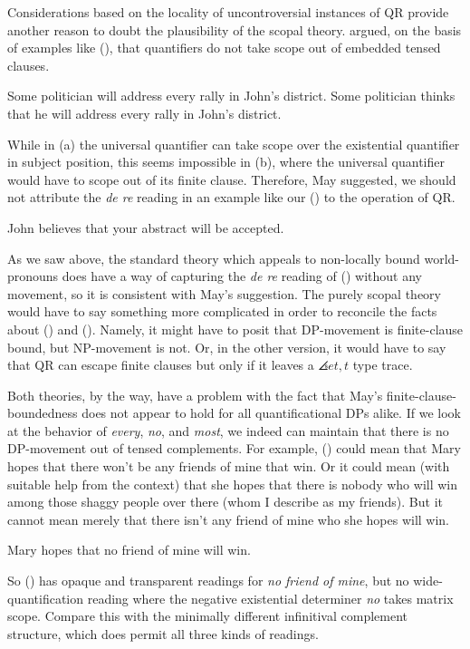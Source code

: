 Considerations based on the locality of uncontroversial instances of QR provide another reason to doubt the plausibility of the scopal theory. \citet{may:diss} argued, on the basis of examples like (\nextx), that quantifiers do not take scope out of embedded tensed clauses.

\pex
\a Some politician will address every rally in John's district. 
\a Some politician thinks that he will address every rally in John's district.
\xe

While in (\lastx a) the universal quantifier can take scope over the existential quantifier in subject position, this seems impossible in (\lastx b), where the universal quantifier would have to scope out of its finite clause. Therefore, May suggested, we should not attribute the \emph{de re} reading in an example like our (\nextx) to the operation of QR.

\ex John believes that your abstract will be accepted. \xe

As we saw above, the standard theory which appeals to non-locally bound world-pronouns does have a way of capturing the \emph{de re} reading of (\lastx) without any movement, so it is consistent with May's suggestion. The purely scopal theory would have to say something more complicated in order to reconcile the facts about (\blastx) and (\lastx). Namely, it might have to posit that DP-movement is finite-clause bound, but NP-movement is not. Or, in the other version, it would have to say that QR can escape finite clauses but only if it leaves a $\angles{et,t}$ type trace.

Both theories, by the way, have a problem with the fact that May's finite-clause-boundedness does not appear to hold for all quantificational DPs alike. If we look at the behavior of \emph{every}, \emph{no}, and \emph{most}, we indeed can maintain that there is no DP-movement out of tensed complements. For example, (\nextx) could mean that Mary hopes that there won't be any friends of mine that win. Or it could mean (with suitable help from the context) that she hopes that there is nobody who will win among those shaggy people over there (whom I describe as my friends). But it cannot mean merely that there isn't any friend of mine who she hopes will win.

\ex Mary hopes that no friend of mine will win. \xe

So (\nextx) has opaque and transparent readings for \emph{no friend of mine}, but no wide-quantification reading where the negative existential determiner \emph{no} takes matrix scope. Compare this with the minimally different infinitival complement structure, which does permit all three kinds of readings.

